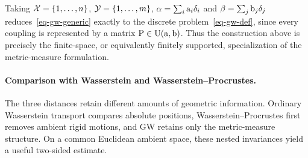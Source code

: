 Taking $\mathcal{X}=\{1,\ldots,n\}$, $\mathcal{Y}=\{1,\ldots,m\}$, $\alpha=\sum_i \mathrm{a}_i\delta_i$ and $\beta=\sum_j \mathrm{b}_j\delta_j$ reduces~\eqref{eq-gw-generic} exactly to the discrete problem~\eqref{eq-gw-def}, since every coupling is represented by a matrix $\mathrm{P}\in\mathrm{U}(\mathrm{a},\mathrm{b})$. Thus the construction above is precisely the finite-space, or equivalently finitely supported, specialization of the metric-measure formulation.

\paragraph{Comparison with Wasserstein and Wasserstein--Procrustes.}
The three distances retain different amounts of geometric information. Ordinary Wasserstein transport compares absolute positions, Wasserstein--Procrustes first removes ambient rigid motions, and GW retains only the metric-measure structure. On a common Euclidean ambient space, these nested invariances yield a useful two-sided estimate.

